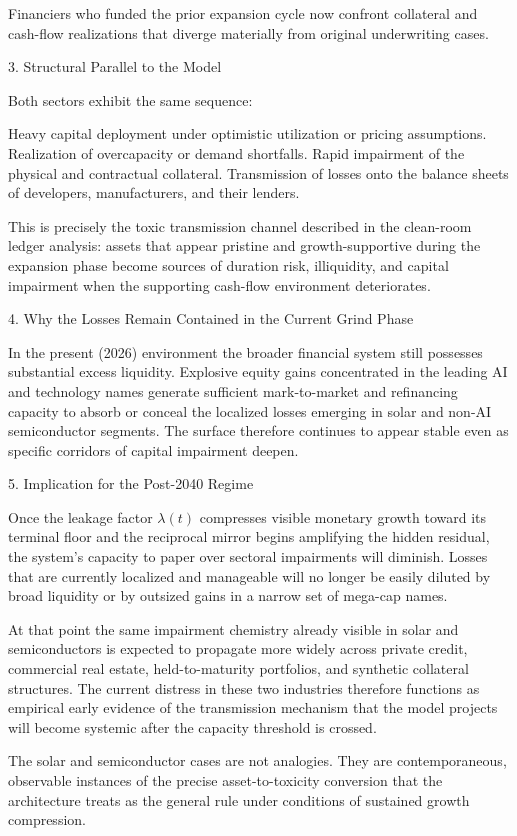 Financiers who funded the prior expansion cycle now confront collateral and cash-flow realizations that diverge materially from original underwriting cases.

3. Structural Parallel to the Model

Both sectors exhibit the same sequence:

Heavy capital deployment under optimistic utilization or pricing assumptions.  
Realization of overcapacity or demand shortfalls.  
Rapid impairment of the physical and contractual collateral.  
Transmission of losses onto the balance sheets of developers, manufacturers, and their lenders.

This is precisely the toxic transmission channel described in the clean-room ledger analysis: assets that appear pristine and growth-supportive during the expansion phase become sources of duration risk, illiquidity, and capital impairment when the supporting cash-flow environment deteriorates.

4. Why the Losses Remain Contained in the Current Grind Phase

In the present (2026) environment the broader financial system still possesses substantial excess liquidity. Explosive equity gains concentrated in the leading AI and technology names generate sufficient mark-to-market and refinancing capacity to absorb or conceal the localized losses emerging in solar and non-AI semiconductor segments. The surface therefore continues to appear stable even as specific corridors of capital impairment deepen.

5. Implication for the Post-2040 Regime

Once the leakage factor \(\lambda(t)\) compresses visible monetary growth toward its terminal floor and the reciprocal mirror begins amplifying the hidden residual, the system’s capacity to paper over sectoral impairments will diminish. Losses that are currently localized and manageable will no longer be easily diluted by broad liquidity or by outsized gains in a narrow set of mega-cap names.  

At that point the same impairment chemistry already visible in solar and semiconductors is expected to propagate more widely across private credit, commercial real estate, held-to-maturity portfolios, and synthetic collateral structures. The current distress in these two industries therefore functions as empirical early evidence of the transmission mechanism that the model projects will become systemic after the capacity threshold is crossed.

The solar and semiconductor cases are not analogies. They are contemporaneous, observable instances of the precise asset-to-toxicity conversion that the architecture treats as the general rule under conditions of sustained growth compression.
